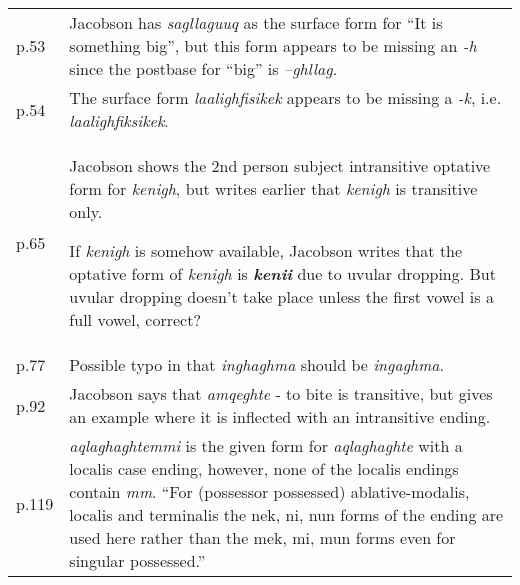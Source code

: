 \documentclass{article}
\begin{document}
\begin{tabular}{p{1cm}p{10.5cm}}
p.53 & Jacobson has \textit{sagllaguuq} as the surface form for ``It is something big'', but this form appears to be missing an \textit{-h} since the postbase for ``big'' is \textit{--ghllag}. \\

p.54 & The surface form \textit{laalighfisikek} appears to be missing a \textit{-k}, i.e. \textit{laalighfiksikek}. \\

p.65 & Jacobson shows the 2nd person subject intransitive optative form for \textit{kenigh}, but writes earlier that \textit{kenigh} is transitive only.

If \textit{kenigh} is somehow available, Jacobson writes that the optative form of \textit{kenigh} is \textit{\textbf{kenii}} due to uvular dropping.
%
But uvular dropping doesn't take place unless the first vowel is a full vowel, correct? \\

p.77 & Possible typo in that \textit{inghaghma} should be \textit{ingaghma}. \\

p.92 & Jacobson says that \textit{amqeghte} - to bite is transitive, but gives an example where it is inflected with an intransitive ending. \\

p.119 & \textit{aqlaghaghtemmi} is the given form for \textit{aqlaghaghte} with a localis case ending, however, none of the localis endings contain \textit{mm}.
%
``For (possessor possessed) ablative-modalis, localis and terminalis the nek, ni, nun forms of the ending are used here rather than the mek, mi, mun forms even for singular possessed.''

\end{tabular}
\end{document}

